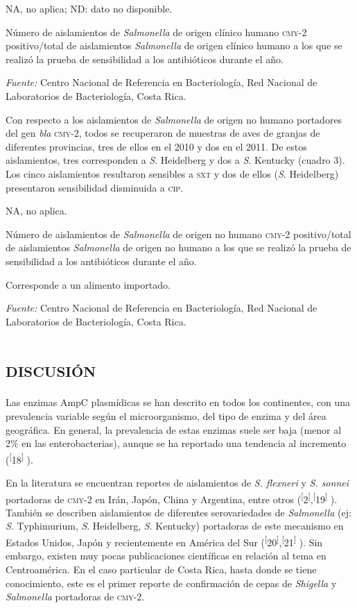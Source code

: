 \documentclass{article}
\begin{document}
NA, no aplica; ND: dato no disponible.

Número de aislamientos de \textit{Salmonella}
de origen clínico humano \textsc{cmy}-2 positivo/total de aislamientos
\textit{Salmonella}
de origen clínico humano a los que se realizó la prueba de sensibilidad a los
antibióticos durante el año.

\textit{Fuente:}
Centro Nacional de Referencia en Bacteriología, Red Nacional de Laboratorios de
Bacteriología, Costa Rica.

Con respecto a los aislamientos de \textit{Salmonella}
de origen no humano portadores del gen \textit{bla}
\textsc{cmy}-2, todos se recuperaron de muestras de aves de granjas de diferentes
provincias, tres de ellos en el 2010 y dos en el 2011. De estos aislamientos,
tres corresponden a \textit{S}. Heidelberg y dos a \textit{S}. Kentucky (cuadro 3). Los cinco aislamientos resultaron sensibles a \textsc{sxt} y dos
de ellos (\textit{S}. Heidelberg) presentaron sensibilidad disminuida a \textsc{cip}.

NA, no aplica.

Número de aislamientos de \textit{Salmonella}
de origen no humano \textsc{cmy}-2 positivo/total de aislamientos \textit{Salmonella}
de origen no humano a los que se realizó la prueba de sensibilidad a los
antibióticos durante el año.

Corresponde a un alimento importado.

\textit{Fuente:}
Centro Nacional de Referencia en Bacteriología, Red Nacional de Laboratorios de
Bacteriología, Costa Rica.

\section{\textsc{discusión}}

Las enzimas AmpC plasmídicas se han descrito en todos los continentes, con una
prevalencia variable según el microorganismo, del tipo de enzima y del área
geográfica. En general, la prevalencia de estas enzimas suele ser baja (menor al
2\% en las enterobacterias), aunque se ha reportado una tendencia al incremento
(\textsuperscript{[}18\textsuperscript{]}
).

En la literatura se encuentran reportes de aislamientos de \textit{S. flexneri}
y \textit{S. sonnei}
portadoras de \textsc{cmy}-2 en Irán, Japón, China y Argentina, entre otros
(\textsuperscript{[}2\textsuperscript{]},\textsuperscript{[}19\textsuperscript{]}
). También se describen aislamientos de diferentes serovariedades de
\textit{Salmonella}
(ej: \textit{S}. Typhimurium, \textit{S}. Heidelberg, \textit{S}. Kentucky) portadoras de este mecanismo en Estados Unidos, Japón y
recientemente en América del Sur (\textsuperscript{[}20\textsuperscript{]},\textsuperscript{[}21\textsuperscript{]}
). Sin embargo, existen muy pocas publicaciones científicas en relación al tema
en Centroamérica. En el caso particular de Costa Rica, hasta donde se tiene
conocimiento, este es el primer reporte de confirmación de cepas de
\textit{Shigella}
y \textit{Salmonella}
portadoras de \textsc{cmy}-2.
\end{document}
